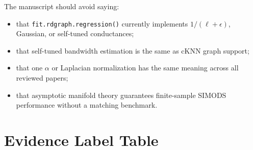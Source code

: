 \documentclass[11pt]{article}
\newcommand{\code}[1]{\texttt{#1}}
\begin{document}
The manuscript should avoid saying:

\begin{itemize}
  \item that \code{fit.rdgraph.regression()} currently implements
    \(1/(\ell+\epsilon)\), Gaussian, or self-tuned conductances;
  \item that self-tuned bandwidth estimation is the same as cKNN graph support;
  \item that one \(\alpha\) or Laplacian normalization has the same meaning
    across all reviewed papers;
  \item that asymptotic manifold theory guarantees finite-sample SIMODS
    performance without a matching benchmark.
\end{itemize}

\section{Evidence Label Table}
\end{document}
